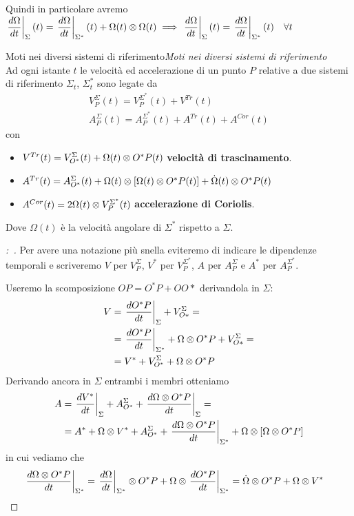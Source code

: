 \documentclass[11pt,a4paper,twoside]{book}
\newenvironment{proposizione}[1][\empty]{\begin{Proposizione}{
\ifx\empty#1\relax\else\mdseries\itshape#1\\\fi
}{}}{\end{Proposizione}}
\newenvironment{dimo}[1][\proofname]{
	\begin{tcolorbox}[
	breakable, 
	enhanced, 
	interior hidden, 
	frame hidden, 
	borderline west = {1pt}{0pt}{gray}, 
	top=0pt, bottom=0pt, left=0pt]
\begin{proof}[#1:~]
}
{
\end{proof}
\end{tcolorbox}
}
\theoremstyle{esss}
\theoremstyle{dotless}
\numberwithin{equation}{section} %
\begin{document}
Quindi in particolare avremo $\left.\dfrac{d\Omega}{dt}\right|_\Sigma (t) =\left. \dfrac{d\Omega}{dt}\right|_{\Sigma^*} (t)+ \Omega (t) \otimes \Omega(t) \implies \left.\dfrac{d\Omega}{dt}\right|_\Sigma (t)=\left. \dfrac{d\Omega}{dt}\right|_{\Sigma^*}(t) \quad \forall t$


\begin{proposizione}[Moti nei diversi sistemi di riferimento]
Ad ogni istante $t$ le velocità ed accelerazione di un punto $P$ relative a due sistemi di riferimento $\Sigma_t$, $\Sigma^*_t$ sono legate da
\begin{gather}
V_P^\Sigma(t) = V_P^{\Sigma^*} (t) + V^{Tr}(t) \\
A_P^{\Sigma}(t)= A_P^{\Sigma^*}(t) + A^{Tr}(t) + A^{Cor}(t)
\end{gather}
con \begin{itemize} 
\item $V^{Tr}(t)=V_{O^*}^{\Sigma}(t) + \Omega(t)\otimes O^*P(t)$ \textbf{velocità di trascinamento}.
\item $A^{Tr}(t)=A_{O^*}^{\Sigma}(t)+ \Omega(t)\otimes \left[ \Omega(t) \otimes O^*P(t) \right] + \dot{\Omega}(t)\otimes O^*P(t)$ 
\item $A^{Cor}(t)= 2 \Omega(t) \otimes V_P^{\Sigma^*}(t)$ \textbf{accelerazione di Coriolis}.
\end{itemize}
Dove $\Omega(t)$ è la velocità angolare di $\Sigma^*$ rispetto a $\Sigma$.
\end{proposizione}
\begin{dimo}
Per avere una notazione più snella eviteremo di indicare le dipendenze temporali e scriveremo $V$ per $V_P^\Sigma$, $V^*$ per $V_P^{\Sigma^*}$, $A$ per $A_P^\Sigma$ e $A^*$ per $A_P^{\Sigma^*}$.\par 
Useremo la scomposizione $OP=O^*P+OO*$ derivandola in $\Sigma$: 
\begin{align*}
V & =\left. \dfrac{d O^*P}{dt}\right|_{\Sigma} + V_{O*}^\Sigma = \\ &= \left. \dfrac{d O^*P}{dt}\right|_{\Sigma^*} + \Omega\otimes O^*P + V_{O*}^\Sigma =\\ &= V^* + V_{O^*}^\Sigma + \Omega\otimes O^*P
\end{align*}
Derivando ancora in $\Sigma$ entrambi i membri otteniamo
\begin{align*}
A &=\left. \dfrac{d V^*}{dt}\right|_\Sigma + A_{O^*}^\Sigma + \left. \dfrac{d \Omega \otimes O^*P}{dt}\right|_{\Sigma}=\\
&= A^* + \Omega \otimes V^* + A_{O^*}^\Sigma + \left. \dfrac{d \Omega \otimes O^*P}{dt}\right|_{\Sigma^*} + \Omega\otimes\left[  \Omega \otimes O^*P\right]
\end{align*}
in cui vediamo che
\begin{align*}
\left. \dfrac{d \Omega \otimes O^*P}{dt}\right|_{\Sigma^*} &= \left. \dfrac{d \Omega }{dt}\right|_{\Sigma^*}\otimes O^*P + \Omega \otimes \left. \dfrac{d  O^*P}{dt}\right|_{\Sigma^*} =\dot{\Omega}\otimes O^*P + \Omega \otimes V^* \qedhere
\end{align*}
\end{dimo}
\end{document}
